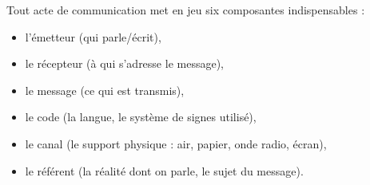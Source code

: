\documentclass[11pt]{article}
\newcommand{\cle}[1]{{\popxbold\color{popdark}#1}}
\begin{document}
\begin{definition}
Tout acte de communication met en jeu six \cle{composantes} indispensables :
\begin{itemize}
\item l'\cle{émetteur} (qui parle/écrit),
\item le \cle{récepteur} (à qui s'adresse le message),
\item le \cle{message} (ce qui est transmis),
\item le \cle{code} (la langue, le système de signes utilisé),
\item le \cle{canal} (le support physique : air, papier, onde radio, écran),
\item le \cle{référent} (la réalité dont on parle, le sujet du message).
\end{itemize}
\end{definition}
\end{document}
